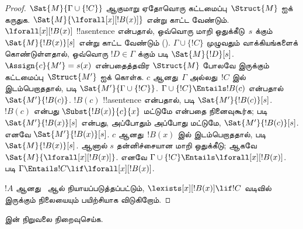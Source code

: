 \documentclass[../../../include/open-logic-section]{subfiles}
\begin{document}
\begin{proof}
{$\Sat{M}{\Gamma \cup \{!C\}}$ ஆகுமாறு ஏதோவொரு கட்டமைப்பு~$\Struct{M}$
ஐக் கருதுக. $\Sat{M}{\lforall[x][!B(x)]}$ என்று காட்ட வேண்டும்.
$\lforall[x][!B(x)]$ !!a{sentence} என்பதால், ஒவ்வொரு மாறி
ஒதுக்கீடு~$s$ க்கும் $\Sat{M}{!B(x)}[s]$ என்று காட்ட வேண்டும்
(). $\Gamma \cup \{!C\}$ முழுவதும்
வாக்கியங்களைக் கொண்டுள்ளதால், ஒவ்வொரு $!D \in \Gamma$ க்கும்
 படி $\Sat{M}{!D}[s]$. $\Assign{c}{M'}
= s(x)$ என்பதைத்தவிர $\Struct{M}$ போலவே இருக்கும் கட்டமைப்பு~$\Struct{M'}$
ஐக் கொள்க. $c$ ஆனது~$\Gamma$ அல்லது~$!C$ இல் இடம்பெறாததால்,
 படி $\Sat{M'}{\Gamma \cup
\{!C\}}$. $\Gamma \cup \{!C\} \Entails !B(c)$ என்பதால்
$\Sat{M'}{!B(c)}$. $!B(c)$ !!a{sentence} என்பதால்,
 படி
$\Sat{M'}{!B(c)}[s]$.
$!B(c)$ என்பது $\Subst{!B(x)}{c}{x}$ மட்டுமே என்பதை நினைவுகூர்க;
 படி
$\Sat{M'}{!B(x)}[s]$ என்பது,
அப்போதும் அப்போது மட்டுமே, $\Sat{M'}{!B(c)}[s]$. எனவே
$\Sat{M'}{!B(x)}[s]$. $c$ ஆனது~$!B(x)$ இல் இடம்பெறாததால்,
 படி $\Sat{M}{!B(x)}[s]$. ஆனால் $s$
தன்னிச்சையான மாறி ஒதுக்கீடு; ஆகவே $\Sat{M}{\lforall[x][!B(x)]}$.
எனவே $\Gamma \cup \{!C\} \Entails \lforall[x][!B(x)]$.
 படி $\Gamma \Entails !C \lif
\lforall[x][!B(x)]$.

$!A$ ஆனது~\QR{} ஆல் நியாயப்படுத்தப்பட்டும், $\lexists[x][!B(x)] \lif
!C$ வடிவில் இருக்கும் நிலையையும் பயிற்சியாக விடுகிறோம்.}{}
\end{proof}

\begin{prob}
   இன் நிறுவலை நிறைவுசெய்க.
\end{prob}
\tagendprob
\end{document}
